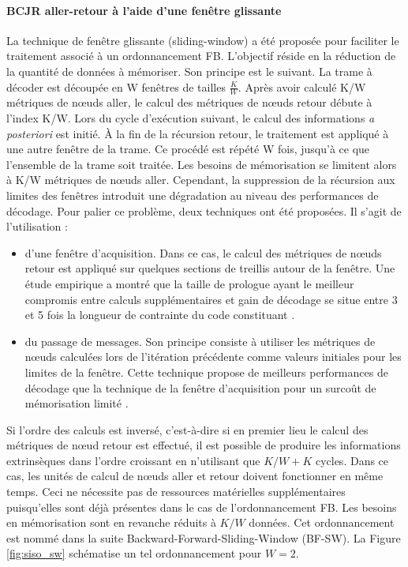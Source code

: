\paragraph*{BCJR aller-retour à l'aide d'une fenêtre glissante}
La technique de fenêtre glissante (sliding-window) a été proposée pour faciliter le traitement associé à un ordonnancement
FB. L'objectif réside en
la réduction de la quantité de données à mémoriser. Son principe est le suivant. La trame à décoder est découpée en W fenêtres 
de tailles $\frac{K}{W}$. Après avoir calculé K/W métriques de nœuds aller, le calcul des métriques de nœuds retour débute à l'index K/W. 
Lors du cycle d'exécution suivant, le calcul des informations \textit{a posteriori} est initié. À la fin de la 
récursion retour, le traitement est appliqué à une autre fenêtre de la trame. Ce procédé est répété W fois, jusqu'à ce que l'ensemble de la trame
soit traitée. Les besoins de mémorisation se limitent alors à K/W métriques de nœuds aller.
Cependant, la suppression de la 
récursion aux limites des fenêtres introduit une dégradation au niveau des performances de décodage. Pour palier ce problème, deux 
techniques ont été proposées. Il s'agit de l'utilisation : 
\begin{itemize}
	\item d'une fenêtre d'acquisition. Dans ce cas, le calcul des métriques de nœuds retour est appliqué sur 
	quelques sections de treillis autour de la fenêtre. Une étude empirique a montré que la 
	taille de prologue ayant le meilleur compromis entre calculs supplémentaires et gain de 
	décodage se situe entre 3 et 5 fois la longueur de contrainte du code constituant \cite{sw_init}.
	\item du passage de messages. Son principe consiste à utiliser les métriques de nœuds calculées lors de l'itération 
	précédente comme valeurs initiales pour les limites de la fenêtre. Cette technique propose de meilleurs 
	performances de décodage que la technique de la fenêtre d'acquisition pour un surcoût de mémorisation limité \cite{muller2006}.\vspace*{1ex}
\end{itemize}

Si l'ordre des calculs est inversé, c'est-à-dire si en premier lieu le calcul des métriques de nœud retour est 
effectué, il est possible de produire les informations extrinsèques dans l'ordre croissant en n'utilisant que $K/W + K$
cycles. Dans ce cas, les unités de calcul de nœuds aller et retour doivent fonctionner en même temps. Ceci ne 
nécessite pas de ressources matérielles supplémentaires puisqu'elles sont déjà présentes dans le cas de l'ordonnancement 
FB. Les besoins en mémorisation sont en revanche réduits à $K/W$ données. Cet ordonnancement est nommé dans la suite 
Backward-Forward-Sliding-Window (BF-SW). La Figure \ref{fig:siso_sw} schématise un tel ordonnancement pour $W=2$.

